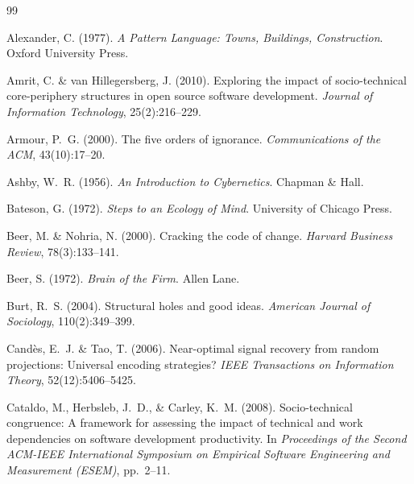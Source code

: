 \documentclass[11pt,a4paper]{article}
\begin{document}


\begin{thebibliography}{99}

Alexander, C. (1977).
\newblock \emph{A Pattern Language: Towns, Buildings, Construction}.
\newblock Oxford University Press.

Amrit, C. \& van Hillegersberg, J. (2010).
\newblock Exploring the impact of socio-technical core-periphery structures in open source software development.
\newblock \emph{Journal of Information Technology}, 25(2):216--229.

Armour, P.~G. (2000).
\newblock The five orders of ignorance.
\newblock \emph{Communications of the ACM}, 43(10):17--20.

Ashby, W.~R. (1956).
\newblock \emph{An Introduction to Cybernetics}.
\newblock Chapman \& Hall.

Bateson, G. (1972).
\newblock \emph{Steps to an Ecology of Mind}.
\newblock University of Chicago Press.

Beer, M. \& Nohria, N. (2000).
\newblock Cracking the code of change.
\newblock \emph{Harvard Business Review}, 78(3):133--141.

Beer, S. (1972).
\newblock \emph{Brain of the Firm}.
\newblock Allen Lane.

Burt, R.~S. (2004).
\newblock Structural holes and good ideas.
\newblock \emph{American Journal of Sociology}, 110(2):349--399.

Cand\`{e}s, E.~J. \& Tao, T. (2006).
\newblock Near-optimal signal recovery from random projections: Universal encoding strategies?
\newblock \emph{IEEE Transactions on Information Theory}, 52(12):5406--5425.

Cataldo, M., Herbsleb, J.~D., \& Carley, K.~M. (2008).
\newblock Socio-technical congruence: A framework for assessing the impact of technical and work dependencies on software development productivity.
\newblock In \emph{Proceedings of the Second ACM-IEEE International Symposium on Empirical Software Engineering and Measurement (ESEM)}, pp.~2--11.


\end{thebibliography}
\end{document}
